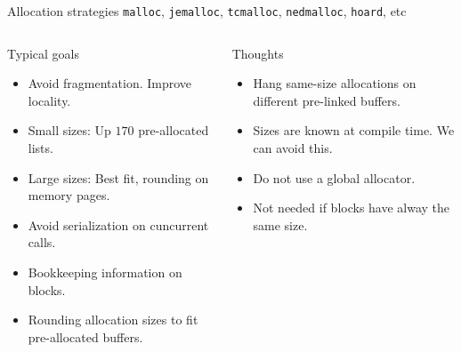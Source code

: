 \documentclass[10pt,aspectratio=169]{beamer}
\begin{document}
\begin{frame}{Allocation strategies}
{\texttt{malloc}, \texttt{jemalloc}, \texttt{tcmalloc},
\texttt{nedmalloc}, \texttt{hoard}, etc}
\begin{columns}
\begin{column}{0.45\textwidth}
\begin{block} {Typical goals}
\begin{itemize}
\item<alert@1> Avoid fragmentation. Improve locality.
\item<alert@2> Small sizes: Up $170$ pre-allocated lists.
\item<alert@3> Large sizes: Best fit, rounding on memory pages.
\item<alert@4> Avoid serialization on cuncurrent calls.
\item<alert@5> Bookkeeping information on blocks.
\item<alert@2> Rounding allocation sizes to fit pre-allocated buffers.
\end{itemize}
\end{block}
\end{column}

\begin{column}{0.45\textwidth}
\begin{block} {Thoughts}
\begin{itemize}
\item<alert@1> Hang same-size allocations on different pre-linked buffers.
\item<alert@2> Sizes are known at compile time. We can avoid this.
\item<alert@3> Do not use a global allocator.
\item<alert@4> Not needed if blocks have alway the same size.
\end{itemize}
\end{block}

\end{column}
\end{columns}
\end{frame}
\end{document}
